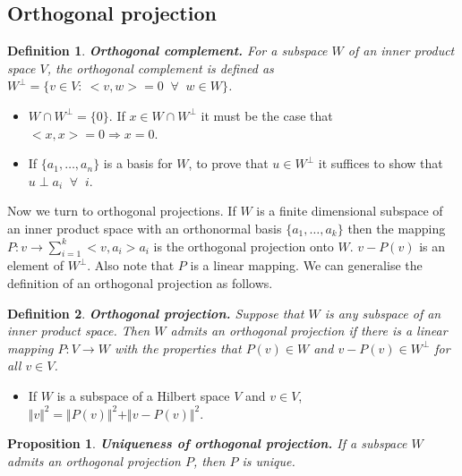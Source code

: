 \documentclass[two column]{article}
\newtheorem{proposition}[theorem]{Proposition}
\newtheorem{definition}{Definition}[subsection]
\begin{document}
\subsection{Orthogonal projection}

\begin{definition}
{\bf Orthogonal complement.} For a subspace $W$ of an inner product space $V$, the orthogonal complement is defined as $W^{\bot}= \{ v \in V : \: < v,w > = 0 \;\; \forall \;\; w \in W \}$.
\end{definition}
\begin{itemize}
\item $W \cap W^{\bot} = \{ 0 \}$. If $x \in W \cap W^{\bot}$ it must be the case that $<x,x> = 0 \Rightarrow x = 0$. 
\item If $\{a_{1}, \dots, a_{n} \}$ is a basis for $W$, to prove that $u \in W^{\bot}$ it suffices to show that $u \perp a_{i} \;\; \forall \;\; i$. \vspace{5pt}
\end{itemize}

Now we turn to orthogonal projections. If $W$ is a finite dimensional subspace of an inner product space with an orthonormal basis $\{a_{1}, \dots, a_{k} \}$ then the mapping $P : v \rightarrow \sum_{i=1}^{k} < v,a_{i} > a_{i}$ is the orthogonal projection onto $W$. $v - P(v)$ is an element of $W^{\bot}$. Also note that $P$ is a linear mapping. We can generalise the definition of an orthogonal projection as follows.\\

\begin{definition}
{\bf Orthogonal projection.} Suppose that $W$ is any subspace of an inner product space. Then $W$ admits an orthogonal projection if there is a linear mapping $P: V \rightarrow W$ with the properties that $P(v) \in W$ and $v - P(v) \in W^{\bot}$ for all $v \in V$.
\end{definition}
\begin{itemize}
\item If $W$ is a subspace of a Hilbert space $V$ and $v \in V$, $\Vert v \Vert^{2} = \Vert P(v) \Vert^{2} + \Vert v - P(v) \Vert^{2}$. \\
\end{itemize}

\begin{proposition}
{\bf Uniqueness of orthogonal projection.} If a subspace $W$ admits an orthogonal projection $P$, then $P$ is unique.\\
\end{proposition}
\end{document}
